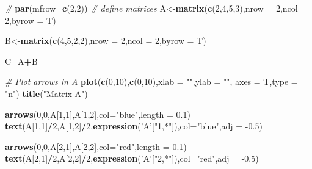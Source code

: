 \documentclass[
]{book}
\newenvironment{Shaded}{\begin{snugshade}}{\end{snugshade}}
\newcommand{\CommentTok}[1]{\textcolor[rgb]{0.56,0.35,0.01}{\textit{#1}}}
\newcommand{\DataTypeTok}[1]{\textcolor[rgb]{0.13,0.29,0.53}{#1}}
\newcommand{\DecValTok}[1]{\textcolor[rgb]{0.00,0.00,0.81}{#1}}
\newcommand{\FloatTok}[1]{\textcolor[rgb]{0.00,0.00,0.81}{#1}}
\newcommand{\KeywordTok}[1]{\textcolor[rgb]{0.13,0.29,0.53}{\textbf{#1}}}
\newcommand{\NormalTok}[1]{#1}
\newcommand{\OperatorTok}[1]{\textcolor[rgb]{0.81,0.36,0.00}{\textbf{#1}}}
\newcommand{\StringTok}[1]{\textcolor[rgb]{0.31,0.60,0.02}{#1}}
\theoremstyle{definition}
\theoremstyle{definition}
\theoremstyle{definition}
\theoremstyle{remark}
\begin{document}
\begin{Shaded}
\begin{Highlighting}[]
\CommentTok{# }
\KeywordTok{par}\NormalTok{(}\DataTypeTok{mfrow=}\KeywordTok{c}\NormalTok{(}\DecValTok{2}\NormalTok{,}\DecValTok{2}\NormalTok{))}
\CommentTok{# define matrices}
\NormalTok{A<-}\KeywordTok{matrix}\NormalTok{(}\KeywordTok{c}\NormalTok{(}\DecValTok{2}\NormalTok{,}\DecValTok{4}\NormalTok{,}\DecValTok{5}\NormalTok{,}\DecValTok{3}\NormalTok{),}\DataTypeTok{nrow =} \DecValTok{2}\NormalTok{,}\DataTypeTok{ncol =} \DecValTok{2}\NormalTok{,}\DataTypeTok{byrow =}\NormalTok{ T)}

\NormalTok{B<-}\KeywordTok{matrix}\NormalTok{(}\KeywordTok{c}\NormalTok{(}\DecValTok{4}\NormalTok{,}\DecValTok{5}\NormalTok{,}\DecValTok{2}\NormalTok{,}\DecValTok{2}\NormalTok{),}\DataTypeTok{nrow =} \DecValTok{2}\NormalTok{,}\DataTypeTok{ncol =} \DecValTok{2}\NormalTok{,}\DataTypeTok{byrow =}\NormalTok{ T)}

\NormalTok{C=A}\OperatorTok{+}\NormalTok{B}

\CommentTok{# Plot arrows in A}
\KeywordTok{plot}\NormalTok{(}\KeywordTok{c}\NormalTok{(}\DecValTok{0}\NormalTok{,}\DecValTok{10}\NormalTok{),}\KeywordTok{c}\NormalTok{(}\DecValTok{0}\NormalTok{,}\DecValTok{10}\NormalTok{),}\DataTypeTok{xlab =} \StringTok{""}\NormalTok{,}\DataTypeTok{ylab =} \StringTok{""}\NormalTok{,}
 \DataTypeTok{axes =}\NormalTok{ T,}\DataTypeTok{type =} \StringTok{"n"}\NormalTok{)}
\KeywordTok{title}\NormalTok{(}\StringTok{"Matrix A"}\NormalTok{)}

\KeywordTok{arrows}\NormalTok{(}\DecValTok{0}\NormalTok{,}\DecValTok{0}\NormalTok{,A[}\DecValTok{1}\NormalTok{,}\DecValTok{1}\NormalTok{],A[}\DecValTok{1}\NormalTok{,}\DecValTok{2}\NormalTok{],}\DataTypeTok{col=}\StringTok{"blue"}\NormalTok{,}\DataTypeTok{length =} \FloatTok{0.1}\NormalTok{)}
\KeywordTok{text}\NormalTok{(A[}\DecValTok{1}\NormalTok{,}\DecValTok{1}\NormalTok{]}\OperatorTok{/}\DecValTok{2}\NormalTok{,A[}\DecValTok{1}\NormalTok{,}\DecValTok{2}\NormalTok{]}\OperatorTok{/}\DecValTok{2}\NormalTok{,}\KeywordTok{expression}\NormalTok{(}\StringTok{'A'}\NormalTok{[}\StringTok{"1,*"}\NormalTok{]),}\DataTypeTok{col=}\StringTok{"blue"}\NormalTok{,}\DataTypeTok{adj =} \FloatTok{-0.5}\NormalTok{)}

\KeywordTok{arrows}\NormalTok{(}\DecValTok{0}\NormalTok{,}\DecValTok{0}\NormalTok{,A[}\DecValTok{2}\NormalTok{,}\DecValTok{1}\NormalTok{],A[}\DecValTok{2}\NormalTok{,}\DecValTok{2}\NormalTok{],}\DataTypeTok{col=}\StringTok{"red"}\NormalTok{,}\DataTypeTok{length =} \FloatTok{0.1}\NormalTok{)}
\KeywordTok{text}\NormalTok{(A[}\DecValTok{2}\NormalTok{,}\DecValTok{1}\NormalTok{]}\OperatorTok{/}\DecValTok{2}\NormalTok{,A[}\DecValTok{2}\NormalTok{,}\DecValTok{2}\NormalTok{]}\OperatorTok{/}\DecValTok{2}\NormalTok{,}\KeywordTok{expression}\NormalTok{(}\StringTok{'A'}\NormalTok{[}\StringTok{"2,*"}\NormalTok{]),}\DataTypeTok{col=}\StringTok{"red"}\NormalTok{,}\DataTypeTok{adj =} \FloatTok{-0.5}\NormalTok{)}


\end{Highlighting}
\end{Shaded}
\end{document}
